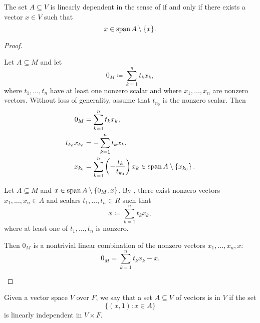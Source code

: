 \begin{proposition}\label{thm:vector_space_linear_dependence}
  The set \( A \subseteq V \) is linearly dependent in the sense of  if and only if there exists a vector \( x \in V \) such that
  \begin{equation*}
    x \in \operatorname{span}{A} \setminus \{ x \}.
  \end{equation*}
\end{proposition}
\begin{proof}\mbox{}
  \begin{description}
    \Implies Let \( A \subseteq M \) and let
    \begin{equation*}
      0_M \coloneqq \sum_{k=1}^n t_k x_k,
    \end{equation*}
    where \( t_1, \ldots, t_n \) have at least one nonzero scalar and where \( x_1, \ldots, x_n \) are nonzero vectors. Without loss of generality, assume that \( t_{n_0} \) is the nonzero scalar. Then
    \begin{align*}
      0_M &= \sum_{k=1}^n t_k x_k, \\
      t_{k_0} x_{k_0} &= -\sum_{k=1}^n t_k x_k, \\
      x_{k_0} &= \sum_{k=1}^n \left(-\frac {t_k} {t_{k_0}} \right) x_k \in \operatorname{span}{A} \setminus \left\{ x_{k_0} \right\}.
    \end{align*}

    \ImpliedBy Let \( A \subseteq M \) and \( x \in \operatorname{span}{A} \setminus \{ 0_M, x \} \). By , there exist nonzero vectors \( x_1, \ldots, x_n \in A \) and scalars \( t_1, \ldots, t_n \in R \) such that
    \begin{equation*}
      x \coloneqq \sum_{k=1}^n t_k x_k,
    \end{equation*}
    where at least one of \( t_1, \ldots, t_n \) is nonzero.

    Then \( 0_M \) is a nontrivial linear combination of the nonzero vectors \( x_1, \ldots, x_n, x \):
    \begin{equation*}
      0_M = \sum_{k=1}^n t_k x_k - x.
    \end{equation*}
  \end{description}
\end{proof}

\begin{definition}\label{affine_independence}
  Given a vector space \( V \) over \( F \), we say that a set \( A \subseteq V \) of vectors is  in \( V \) if the set
  \begin{equation*}
    \{ (x, 1) \colon x \in A \}
  \end{equation*}
  is linearly independent in \( V \times F \).
\end{definition}

